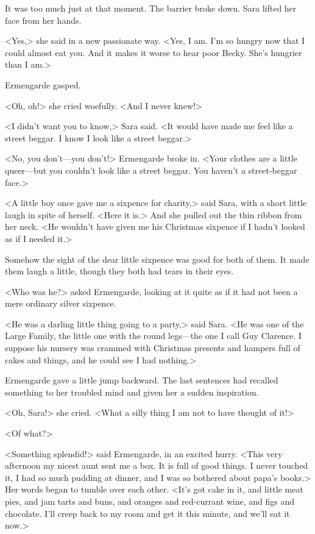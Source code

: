 It was too much just at that moment. The barrier broke down. Sara lifted her face from her hands.

<Yes,> she said in a new passionate way. <Yes, I am. I'm so hungry now that I could almost eat you. And it makes it worse to hear poor Becky. She's hungrier than I am.>

Ermengarde gasped.

<Oh, oh!> she cried woefully. <And I never knew!>

<I didn't want you to know,> Sara said. <It would have made me feel like a street beggar. I know I look like a street beggar.>

<No, you don't—you don't!> Ermengarde broke in. <Your clothes are a little queer—but you couldn't look like a street beggar. You haven't a street-beggar face.>

<A little boy once gave me a sixpence for charity,> said Sara, with a short little laugh in spite of herself. <Here it is.> And she pulled out the thin ribbon from her neck. <He wouldn't have given me his Christmas sixpence if I hadn't looked as if I needed it.>

Somehow the sight of the dear little sixpence was good for both of them. It made them laugh a little, though they both had tears in their eyes.

<Who was he?> asked Ermengarde, looking at it quite as if it had not been a mere ordinary silver sixpence.

<He was a darling little thing going to a party,> said Sara. <He was one of the Large Family, the little one with the round legs—the one I call Guy Clarence. I suppose his nursery was crammed with Christmas presents and hampers full of cakes and things, and he could see I had nothing.>

Ermengarde gave a little jump backward. The last sentences had recalled something to her troubled mind and given her a sudden inspiration.

<Oh, Sara!> she cried. <What a silly thing I am not to have thought of it!>

<Of what?>

<Something splendid!> said Ermengarde, in an excited hurry. <This very afternoon my nicest aunt sent me a box. It is full of good things. I never touched it, I had so much pudding at dinner, and I was so bothered about papa's books.> Her words began to tumble over each other. <It's got cake in it, and little meat pies, and jam tarts and buns, and oranges and red-currant wine, and figs and chocolate. I'll creep back to my room and get it this minute, and we'll eat it now.>

